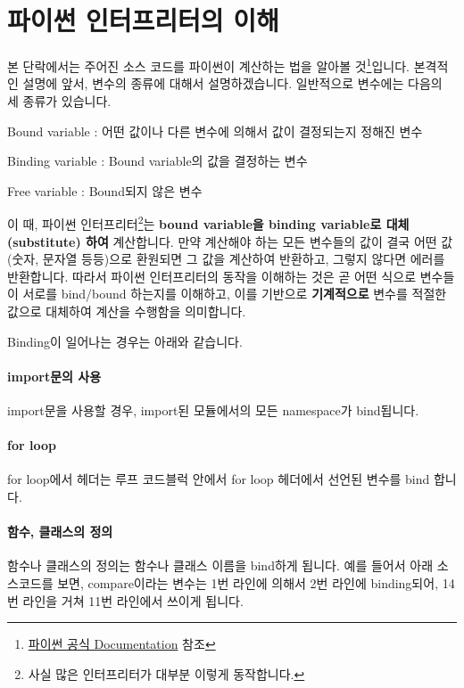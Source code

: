 \documentclass[titlepage]{report}
\begin{document}
\section{파이썬 인터프리터의 이해}

본 단락에서는 주어진 소스 코드를 파이썬이 계산하는 법을 알아볼 것\footnote{\href{https://docs.python.org/3/reference/executionmodel.html}{파이썬 공식 Documentation} 참조}입니다. 본격적인 설명에 앞서, 변수의 종류에 대해서 설명하겠습니다. 일반적으로 변수에는 다음의 세 종류가 있습니다. 

\begin{compactitem} 
\item Bound variable : 어떤 값이나 다른 변수에 의해서 값이 결정되는지 정해진 변수
\item Binding variable : Bound variable의 값을 결정하는 변수 
\item Free variable : Bound되지 않은 변수 
\end{compactitem}

이 때, 파이썬 인터프리터\footnote{사실 많은 인터프리터가 대부분 이렇게 동작합니다.}는 \textbf{bound variable을 binding variable로 대체(substitute) 하여} 계산합니다. 만약 계산해야 하는 모든 변수들의 값이 결국 어떤 값(숫자, 문자열 등등)으로 환원되면 그 값을 계산하여 반환하고, 그렇지 않다면 에러를 반환합니다. 따라서 파이썬 인터프리터의 동작을 이해하는 것은 곧 어떤 식으로 변수들이 서로를 bind/bound 하는지를 이해하고, 이를 기반으로 \textbf{기계적으로} 변수를 적절한 값으로 대체하여 계산을 수행함을 의미합니다. 

Binding이 일어나는 경우는 아래와 같습니다. 

\paragraph{import문의 사용} import문을 사용할 경우, import된 모듈에서의 모든 namespace가 bind됩니다. 

\paragraph{for loop} for loop에서 헤더는 루프 코드블럭 안에서 for loop 헤더에서 선언된 변수를 bind 합니다. 

\paragraph{함수, 클래스의 정의} 함수나 클래스의 정의는 함수나 클래스 이름을 bind하게 됩니다. 예를 들어서 아래 소스코드를 보면, compare이라는 변수는 1번 라인에 의해서 2번 라인에 binding되어, 14번 라인을 거쳐 11번 라인에서 쓰이게 됩니다. 
\end{document}
